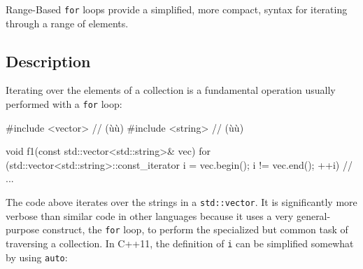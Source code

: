 

\label{range-based-for-loops}
\setcounter{table}{0}
\setcounter{footnote}{0}
\setcounter{lstlisting}{0}

Range-Based \lstinline!for! loops provide a simplified, more compact,
syntax for iterating through a range of elements.

\subsection[Description]{Description}\label{description-rangefor}

Iterating over the elements of a collection is a fundamental operation
usually performed with a \lstinline!for! loop:

\begin{emcppslisting}[emcppsbatch=e1]
#include <vector>  // (ù{}ù)
#include <string>  // (ù{}ù)

void f1(const std::vector<std::string>& vec)
{
    for (std::vector<std::string>::const_iterator i = vec.begin();
         i != vec.end(); ++i)
    {
        // ...
    }
}
\end{emcppslisting}
    

\noindent The code above iterates over the strings in a \lstinline!std::vector!. It
is significantly more verbose than similar code in other languages
because it uses a very general-purpose construct, the \lstinline!for! loop,
to perform the specialized but common task of traversing a collection.
In C++11, the definition of \lstinline!i! can be simplified somewhat by
using \lstinline!auto!:

